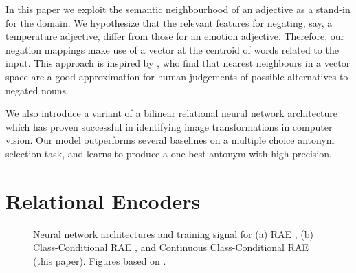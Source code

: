 \documentclass[11pt]{article}
\begin{document}
In this paper we exploit the semantic neighbourhood of an adjective
as a stand-in for the domain. We hypothesize that the relevant
features for negating, say, a temperature adjective, differ from those
for an emotion adjective. Therefore, our negation mappings make use of a
vector at the centroid of words related to the input.
This approach is inspired by \citet{kruszewski:16},
 who find that nearest neighbours in a vector space are a good approximation for human judgements of possible alternatives to negated nouns.

We also introduce a variant of a bilinear relational neural network architecture which has proven successful in 
identifying image transformations in computer vision. Our model outperforms several baselines on a
multiple choice antonym selection task, and learns to produce a
one-best antonym with high precision.


\section{Relational Encoders}

\begin{figure}[h!t]
\centering
{}
\quad
{}
\quad
{}
\vspace{-4mm}
\caption{Neural network architectures and training signal for (a) RAE \citep{memisevic:13}, (b) Class-Conditional RAE \citet{rudy:15}, and Continuous Class-Conditional RAE (this paper). Figures based on \citet{memisevic:13}.}
\label{f:arch}
\end{figure}
\end{document}
